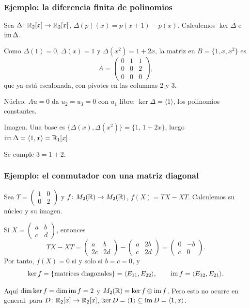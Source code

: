 \begin{frame}
    \frametitle{Ejemplo: la diferencia finita de polinomios}

    \begin{example}
        Sea $\Delta\colon\mathbb{R}_2[x]\to\mathbb{R}_2[x]$, $\Delta(p)(x)=p(x+1)-p(x)$.
        Calculemos $\ker\Delta$ e $\operatorname{im}\Delta$.
    \end{example}

    Como $\Delta(1)=0$, $\Delta(x)=1$ y $\Delta(x^2)=1+2x$, la matriz
    en $B=\{1,x,x^2\}$ es
    \[
        A=\begin{pmatrix}0&1&1\\0&0&2\\0&0&0\end{pmatrix},
    \]
    que ya está escalonada, con pivotes en las columnas $2$ y $3$.

    \medskip

    \alert{Núcleo.} $Au=0$ da $u_2=u_3=0$ con $u_1$ libre:
    $\ker\Delta=\langle1\rangle$, los polinomios constantes.

    \medskip

    \alert{Imagen.} Una base es $\{\Delta(x),\Delta(x^2)\}=\{1,\,1+2x\}$,
    luego $\operatorname{im}\Delta=\langle1,x\rangle=\mathbb{R}_1[x]$.

    \medskip

    Se cumple $3=1+2$.
\end{frame}


\begin{frame}
    \frametitle{Ejemplo: el conmutador con una matriz diagonal}

    \begin{example}
        Sea $T=\begin{pmatrix}1&0\\0&2\end{pmatrix}$ y
        $f\colon M_2(\mathbb{R})\to M_2(\mathbb{R})$, $f(X)=TX-XT$. Calculemos su núcleo
        y su imagen.
    \end{example}

    Si $X=\begin{pmatrix}a&b\\c&d\end{pmatrix}$, entonces
    \[
        TX-XT=\begin{pmatrix}a&b\\2c&2d\end{pmatrix}
        -\begin{pmatrix}a&2b\\c&2d\end{pmatrix}
        =\begin{pmatrix}0&-b\\c&0\end{pmatrix}.
    \]
    Por tanto, $f(X)=0$ si y solo si $b=c=0$, y
    \[
        \ker f=\{\text{matrices diagonales}\}=\langle E_{11},E_{22}\rangle,
        \qquad
        \operatorname{im} f=\langle E_{12},E_{21}\rangle.
    \]

    \medskip

    Aquí $\dim\ker f=\dim\operatorname{im} f=2$ y $M_2(\mathbb{R})=\ker f\oplus\operatorname{im} f$. Pero esto
    \alert{no} ocurre en general: para $D\colon\mathbb{R}_2[x]\to\mathbb{R}_2[x]$,
    $\ker D=\langle1\rangle\subseteq\operatorname{im} D=\langle1,x\rangle$.
\end{frame}


